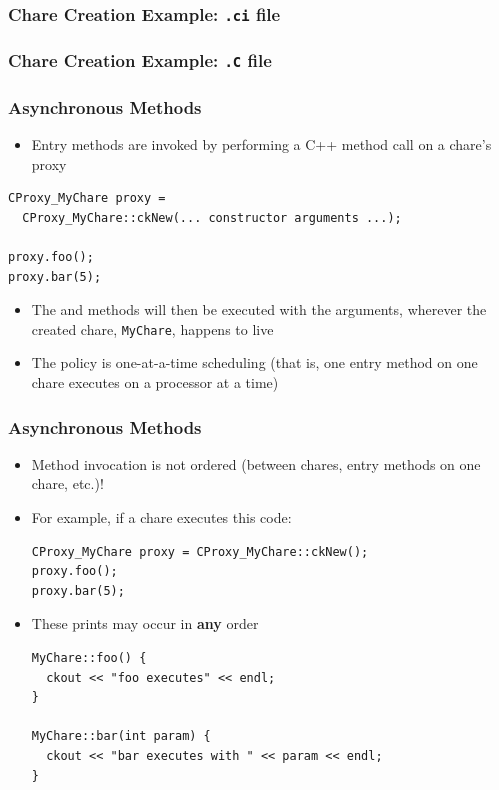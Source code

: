 \begin{frame}[fragile]
  \frametitle{Chare Creation Example: \texttt{.ci} file}
  
\end{frame}

\begin{frame}[fragile]
  \frametitle{Chare Creation Example: \texttt{.C} file}
  
\end{frame}

\begin{frame}[fragile]
  \frametitle{Asynchronous Methods}
  \begin{itemize}
  \item Entry methods are invoked by performing a C++ method call on a chare's
    proxy
  \end{itemize}
  \begin{lstlisting}
CProxy_MyChare proxy =
  CProxy_MyChare::ckNew(... constructor arguments ...);

proxy.foo();
proxy.bar(5);
\end{lstlisting}
\begin{itemize}
\item The  and  methods will then be executed with the
  arguments, wherever the created chare, \texttt{MyChare}, happens to live
\item The policy is one-at-a-time scheduling (that is, one entry method on one
  chare executes on a processor at a time)
\end{itemize}
\end{frame}

\begin{frame}[fragile]
  \frametitle{Asynchronous Methods}
  \begin{itemize}
  \item Method invocation is not ordered (between chares, entry methods on one
    chare, etc.)!
  \item For example, if a chare executes this code:
  \begin{lstlisting}
CProxy_MyChare proxy = CProxy_MyChare::ckNew();
proxy.foo();
proxy.bar(5);
  \end{lstlisting}
  \item These prints may occur in \textbf{any} order
  \begin{lstlisting}
MyChare::foo() {
  ckout << "foo executes" << endl;
}

MyChare::bar(int param) {
  ckout << "bar executes with " << param << endl;
}
\end{lstlisting}
  \end{itemize}
\end{frame}

